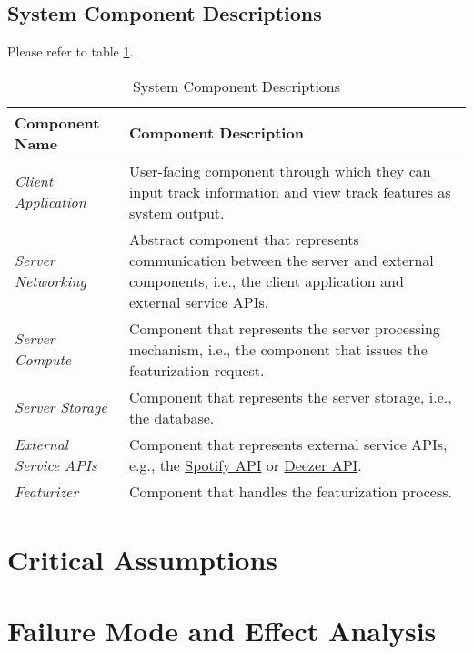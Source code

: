 \documentclass{article}
\begin{document}
\subsection{System Component Descriptions}
Please refer to table \ref{tbl:sys-cmpnt-desc}.
\begin{table}[h!]
    \centering
    \begin{tabular}{ p{.25\linewidth} || p{.65\linewidth} }
      \textbf{Component Name} & \textbf{Component Description} \\
      \toprule
      \emph{Client Application} & User-facing component through which they can input track information and view track features as system output. \\
      \midrule
      \emph{Server Networking} & Abstract component that represents communication between the server and external components, i.e., the client application and external service APIs. \\
      \midrule
      \emph{Server Compute} & Component that represents the server processing mechanism, i.e., the component that issues the featurization request. \\
      \midrule
      \emph{Server Storage} & Component that represents the server storage, i.e., the database. \\
      \midrule
      \emph{External Service APIs} & Component that represents external service APIs, e.g., the \href{https://developer.spotify.com/}{Spotify API} or \href{https://developers.deezer.com/}{Deezer API}. \\
      \midrule
      \emph{Featurizer} & Component that handles the featurization process.
    \end{tabular}
    \label{tbl:sys-cmpnt-desc}
    \caption{System Component Descriptions}
  \end{table}

\section{Critical Assumptions}


\section{Failure Mode and Effect Analysis}
\end{document}
